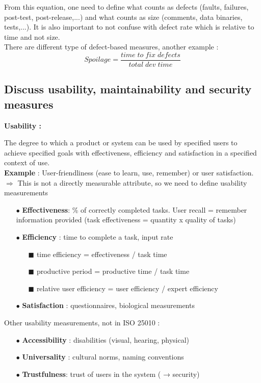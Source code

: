 \documentclass{article}
\begin{document}
From this equation, one need to define what counts as defects (faults, failures, post-test, post-release,...)
and what counts as size (comments, data binaries, tests,...). It is also important to not confuse with
defect rate which is relative to time and not size.\\

\noindent There are different type of defect-based measures, another example :
$$Spoilage = \frac{time\;to\;fix\;defects}{total\;dev\;time}$$
\subsection{Discuss
usability, maintainability and security measures}
\begin{center}
    \textbf{Usability :}
\end{center}
The degree to which a product or system can be used by specified users to achieve specified
goals with effectiveness, efficiency and satisfaction in a specified context of use.\\

\textbf{Example} : User-friendliness (ease to learn, use, remember) or user satisfaction.\\
$\Rightarrow$ This is not a directly measurable attribute, so we need to define usability measurements
\begin{itemize}
    \item[$\bullet$] \textbf{Effectiveness}: \% of correctly completed tasks. User recall = remember information provided (task effectiveness = quantity x quality of tasks)
    \item[$\bullet$]  \textbf{Efficiency} : time to complete a task, input rate
    \begin{itemize}
        \item[$\blacksquare$] time efficiency = effectiveness / task time
        \item[$\blacksquare$] productive period = productive time / task time
        \item[$\blacksquare$] relative user efficiency = user efficiency / expert efficiency
    \end{itemize}
    \item[$\bullet$] \textbf{Satisfaction} : questionnaires, biological measurements\\
\end{itemize}

\noindent Other usability measurements, not in ISO 25010 :
\begin{itemize}
    \item[$\bullet$] \textbf{Accessibility} : disabilities (visual, hearing, physical)
    \item[$\bullet$] \textbf{Universality} : cultural norms, naming conventions
    \item[$\bullet$] \textbf{Trustfulness}: trust of users in the system ( → security)\\
\end{itemize}
\end{document}
